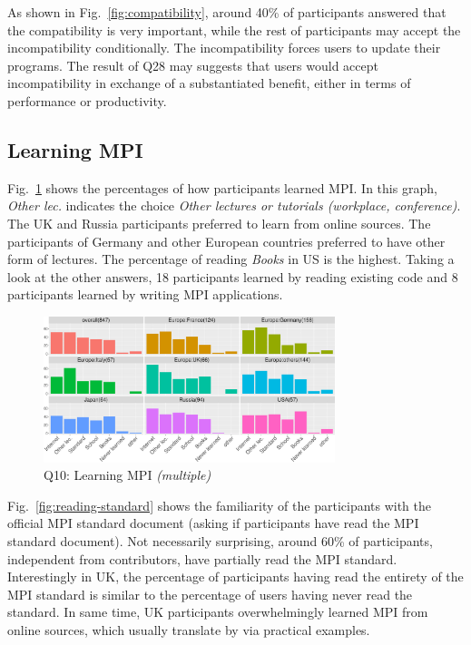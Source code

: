 \documentclass[preprint,5p,times]{elsarticle}
\def\myquote#1{{\it #1}}
\def\countries{contributors}%
\begin{document}
As shown in Fig.~\ref{fig:compatibility}, around 40\% of participants answered
that the compatibility is very important, while the rest of participants may
accept the incompatibility conditionally. The incompatibility forces users to
update their programs. The result of Q28 may suggests that users would accept
incompatibility in exchange of a substantiated benefit, either in terms of
performance or productivity.

\subsection{Learning MPI}\label{sec:learning-mpi}

Fig.~\ref{fig:learning-mpi} shows the percentages of how participants learned
MPI. In this graph, \myquote{Other lec.} indicates the choice \myquote{Other
lectures or tutorials (workplace, conference)}. The UK and Russia participants
preferred to learn from online sources. The participants of Germany and other
European countries preferred to have other form of lectures. The percentage of
reading \myquote{Books} in US is the highest. Taking a look at the other
answers, 18 participants learned by reading existing code and 8 participants
learned by writing MPI applications.

\begin{figure}[htb]
\begin{center}
\includegraphics[width=8.5cm]{R-scripts/Q10.pdf}
\caption{Q10: Learning MPI {\it(multiple)}}
\label{fig:learning-mpi}
\end{center}
\end{figure}

Fig.~\ref{fig:reading-standard} shows the familiarity of the participants with
the official MPI standard document (asking if participants have read the MPI
standard document). Not necessarily surprising, around 60\% of participants,
independent from \countries, have partially read the MPI standard. Interestingly
in UK, the percentage of participants having read the entirety of the MPI
standard is similar to the percentage of users having never read the standard.
In same time, UK participants overwhelmingly learned MPI from online sources,
which usually translate by via practical examples.
\end{document}
